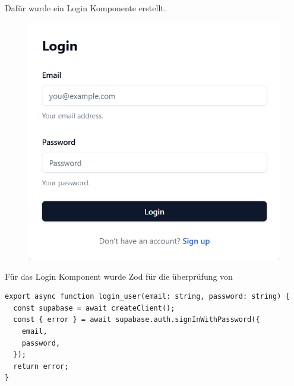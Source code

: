 \begin{inhalt}
Dafür wurde ein Login Komponente erstellt.

\begin{figure}[!htb]
\centering
\includegraphics[width=1\textwidth]{files/Thomas/pics/Website/Login/login.png}
\caption[Bildbezeichnung für Abbildungsverzeichnis]{}
\label{fig:gehaeuse_internet_bild}
\end{figure}

Für das Login Komponent wurde Zod für die überprüfung von 

\begin{lstlisting}[style=mytsx]
export async function login_user(email: string, password: string) {
  const supabase = await createClient();
  const { error } = await supabase.auth.signInWithPassword({
    email,
    password,
  });
  return error;
}
\end{lstlisting}































\end{inhalt}

